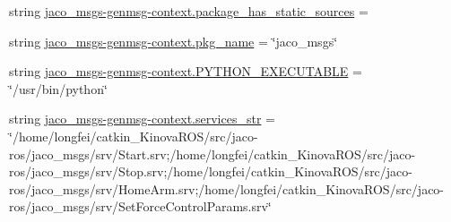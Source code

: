 \begin{DoxyCompactItemize}
\item 
string \hyperlink{namespacejaco__msgs-genmsg-context_a1256415124e8f3ceb46c2256ae4626f4}{jaco\+\_\+msgs-\/genmsg-\/context.\+package\+\_\+has\+\_\+static\+\_\+sources} = \textquotesingle{}\textquotesingle{}
\item 
string \hyperlink{namespacejaco__msgs-genmsg-context_a3990cb49bbd31c83da423fce8baf50ea}{jaco\+\_\+msgs-\/genmsg-\/context.\+pkg\+\_\+name} = \char`\"{}jaco\+\_\+msgs\char`\"{}
\item 
string \hyperlink{namespacejaco__msgs-genmsg-context_a2658c036e3849ddeebfb3f13d61d6c5d}{jaco\+\_\+msgs-\/genmsg-\/context.\+P\+Y\+T\+H\+O\+N\+\_\+\+E\+X\+E\+C\+U\+T\+A\+B\+LE} = \char`\"{}/usr/bin/python\char`\"{}
\item 
string \hyperlink{namespacejaco__msgs-genmsg-context_ae9e4dc77a4ea2769807068370b60d144}{jaco\+\_\+msgs-\/genmsg-\/context.\+services\+\_\+str} = \char`\"{}/home/longfei/catkin\+\_\+\+Kinova\+R\+OS/src/jaco-\/ros/jaco\+\_\+msgs/srv/Start.\+srv;/home/longfei/catkin\+\_\+\+Kinova\+R\+OS/src/jaco-\/ros/jaco\+\_\+msgs/srv/Stop.\+srv;/home/longfei/catkin\+\_\+\+Kinova\+R\+OS/src/jaco-\/ros/jaco\+\_\+msgs/srv/Home\+Arm.\+srv;/home/longfei/catkin\+\_\+\+Kinova\+R\+OS/src/jaco-\/ros/jaco\+\_\+msgs/srv/Set\+Force\+Control\+Params.\+srv\char`\"{}
\end{DoxyCompactItemize}
